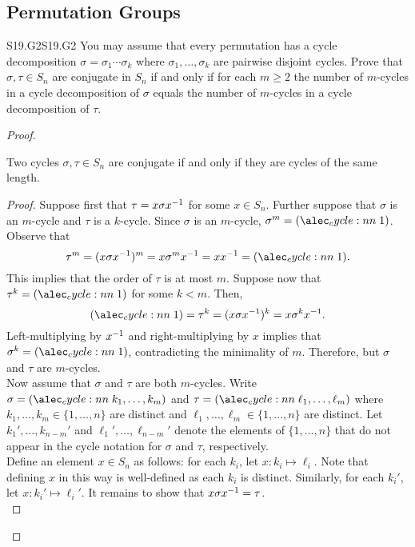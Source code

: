 \documentclass[../../AlgebraQualSolutions.tex]{subfiles}
\begin{document}
\subsection{Permutation Groups}

\begin{prob}{S19.G2}{S19.G2}
    You may assume that every permutation has a cycle decomposition $\sigma = \sigma_1 \cdots \sigma_k$ where $\sigma_1, \ldots, \sigma_k$ are pairwise disjoint cycles. Prove that $\sigma, \tau \in S_n$ are conjugate in $S_n$ if and only if for each $m \geq 2$ the number of $m$-cycles in a cycle decomposition of $\sigma$ equals the number of $m$-cycles in a cycle decomposition of $\tau$.
\end{prob}

\begin{proof}
\begin{claim}

    Two cycles $\sigma, \tau \in S_n$ are conjugate if and only if they are cycles of the same length.
    \begin{proof}
        Suppose first that $\tau = x \sigma x^{-1}$ for some $x \in S_n$. Further suppose that $\sigma$ is an $m$-cycle and $\tau$ is a $k$-cycle. Since $\sigma$ is an $m$-cycle, $\sigma^m = \cycle{1}$. Observe that
            \[\tau^m = (x\sigma x\inv)^m = x\sigma^m x\inv = xx\inv = \cycle{1}.\]
        This implies that the order of $\tau$ is at most $m$. Suppose now that $\tau^k = \cycle{1}$ for some $k < m$. Then, 
            \[\cycle{1} = \tau^k = (x\sigma x\inv)^k = x \sigma^k x\inv.\]
        Left-multiplying by $x^{-1}$ and right-multiplying by $x$ implies that $\sigma^k = \cycle{1}$, contradicting the minimality of $m$. Therefore, but $\sigma$ and $\tau$ are $m$-cycles.\\
        
        Now assume that $\sigma$ and $\tau$ are both $m$-cycles. Write $\sigma = \cycle{k_1, \ldots, k_m}$ and $\tau = \cycle{\ell_1, \ldots, \ell_m}$ where $k_1,\ldots,k_m \in \{1,\ldots, n\}$ are distinct and $\ell_1, \ldots, \ell_m \in \{1,\ldots, n\}$ are  distinct. Let $k_1', \ldots, k_{n-m}'$ and $\ell_1', \ldots, \ell_{n-m}'$ denote the elements of $\{1,\ldots, n\}$ that do not appear in the cycle notation for $\sigma$ and $\tau$, respectively.\\

        Define an element $x \in S_n$ as follows: for each $k_i$, let $x: k_i \mapsto \ell_i$. Note that defining $x$ in this way is well-defined as each $k_i$ is distinct. Similarly, for each $k_i'$, let $x: k_i' \mapsto \ell_i'$. It remains to show that $x\sigma x ^{-1} = \tau$.\\


\end{proof}
\end{claim}
\end{proof}
\end{document}
